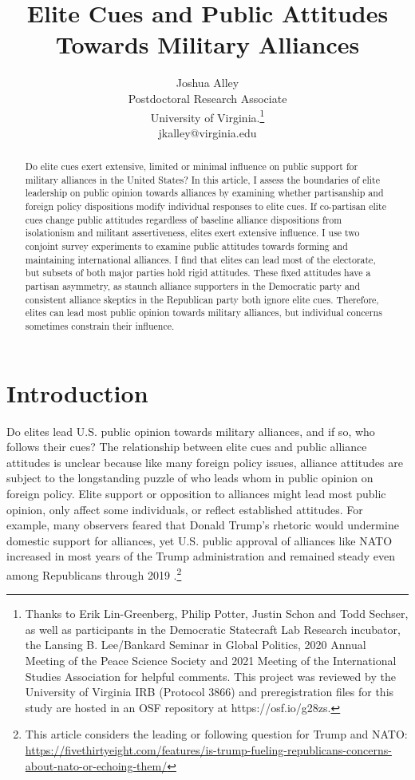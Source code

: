 \documentclass[12pt]{article}
\title{\textbf{Elite Cues and Public Attitudes Towards Military Alliances}}
\author{Joshua Alley \\
Postdoctoral Research Associate \\
University of Virginia.\thanks{Thanks to Erik Lin-Greenberg, Philip Potter, Justin Schon and Todd Sechser, as well as participants in the Democratic Statecraft Lab Research incubator, the Lansing B. Lee/Bankard Seminar in Global Politics, 2020 Annual Meeting of the Peace Science Society and 2021 Meeting of the International Studies Association for helpful comments. This project was reviewed by the University of Virginia IRB (Protocol 3866) and preregistration files for this study are hosted in an OSF repository at https://osf.io/g28zs.} \\
jkalley@virginia.edu
}
\date{}
\begin{document}
\maketitle 

\doublespace 

\begin{abstract}
Do elite cues exert extensive, limited or minimal influence on public support for military alliances in the United States? 
In this article, I assess the boundaries of elite leadership on public opinion towards alliances by examining whether partisanship and foreign policy dispositions modify individual responses to elite cues.
If co-partisan elite cues change public attitudes regardless of baseline alliance dispositions from isolationism and militant assertiveness, elites exert extensive influence. 
I use two conjoint survey experiments to examine public attitudes towards forming and maintaining international alliances.  
I find that elites can lead most of the electorate, but subsets of both major parties hold rigid attitudes. 
These fixed attitudes have a partisan asymmetry, as staunch alliance supporters in the Democratic party and consistent alliance skeptics in the Republican party both ignore elite cues.  
Therefore, elites can lead most public opinion towards military alliances, but individual concerns sometimes constrain their influence.  
\end{abstract}


\newpage 


\section{Introduction}


Do elites lead U.S. public opinion towards military alliances, and if so, who follows their cues?
The relationship between elite cues and public alliance attitudes is unclear because like many foreign policy issues, alliance attitudes are subject to the longstanding puzzle of who leads whom in public opinion on foreign policy.
Elite support or opposition to alliances might lead most public opinion, only affect some individuals, or reflect established attitudes.
For example, many observers feared that Donald Trump's rhetoric would undermine domestic support for alliances, yet U.S. public approval of alliances like NATO increased in most years of the Trump administration and remained steady even among Republicans through 2019 \citep{PewNATO2020}.\footnote{This article considers the leading or following question for Trump and NATO: \url{https://fivethirtyeight.com/features/is-trump-fueling-republicans-concerns-about-nato-or-echoing-them/}}
\end{document}
